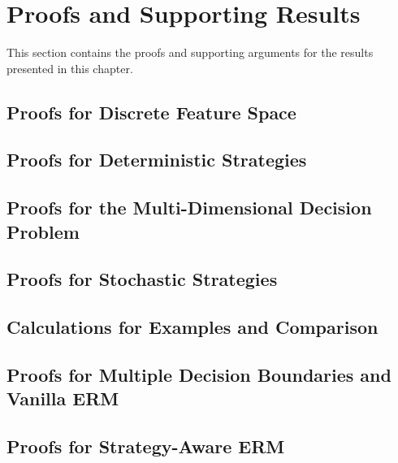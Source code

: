 \section{Proofs and Supporting Results}\label{sec:proofs_ch2}

This section contains the proofs and supporting arguments for the results presented in this chapter.

\subsection{Proofs for Discrete Feature Space}\label{subsec:proofs_discrete_feature_space}


\subsection{Proofs for Deterministic Strategies}\label{subsec:proofs_deterministic_strategy}


\subsection{Proofs for the Multi-Dimensional Decision Problem}\label{subsec:proofs_multidimensional_decision}


\subsection{Proofs for Stochastic Strategies}\label{subsec:proofs_stochastic_strategy}


\subsection{Calculations for Examples and Comparison}\label{subsec:proofs_examples_comparison}


\subsection{Proofs for Multiple Decision Boundaries and Vanilla ERM}\label{subsec:proofs_vanilla_erm}


\subsection{Proofs for Strategy-Aware ERM}\label{subsec:proofs_strategy_aware_erm}

